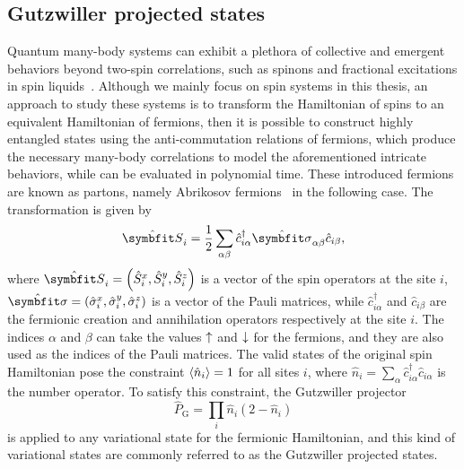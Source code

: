 \subsection{Gutzwiller projected states}
\label{sec:gutz}

Quantum many-body systems can exhibit a plethora of collective and emergent behaviors beyond two-spin correlations, such as spinons and fractional excitations in spin liquids~\cite{misguich2010quantum, balents2010spin, mila2015frustrated}. Although we mainly focus on spin systems in this thesis, an approach to study these systems is to transform the Hamiltonian of spins to an equivalent Hamiltonian of fermions, then it is possible to construct highly entangled states using the anti-commutation relations of fermions, which produce the necessary many-body correlations to model the aforementioned intricate behaviors, while can be evaluated in polynomial time. These introduced fermions are known as partons, namely Abrikosov fermions~\cite{abrikosov1965electron} in the following case. The transformation is given by
\begin{equation}
\hat{\vS}_i = \frac{1}{2} \sum_{\alpha \beta} \hat{c}^\dagger_{i \alpha} \hat{\vsi}_{\alpha \beta} \hat{c}_{i \beta},
\end{equation}
where $\hat{\vS}_i = \left( \hat{S}^x_i, \hat{S}^y_i, \hat{S}^z_i \right)$ is a vector of the spin operators at the site $i$, $\hat{\vsi} = \left( \hat{\sigma}^x_i, \hat{\sigma}^y_i, \hat{\sigma}^z_i \right)$ is a vector of the Pauli matrices, while $\hat{c}^\dagger_{i \alpha}$ and $\hat{c}_{i \beta}$ are the fermionic creation and annihilation operators respectively at the site $i$. The indices $\alpha$ and $\beta$ can take the values ${\uparrow}$ and ${\downarrow}$ for the fermions, and they are also used as the indices of the Pauli matrices. The valid states of the original spin Hamiltonian pose the constraint $\ev{\hat{n}_i} = 1$ for all sites $i$, where $\hat{n}_i = \sum_\alpha \hat{c}^\dagger_{i \alpha} \hat{c}_{i \alpha}$ is the number operator. To satisfy this constraint, the Gutzwiller projector~\cite{gutzwiller1963effect}
\begin{equation}
\hat{P}_\text{G} = \prod_i \hat{n}_i (2 - \hat{n}_i)
\end{equation}
is applied to any variational state for the fermionic Hamiltonian, and this kind of variational states are commonly referred to as the Gutzwiller projected states.

